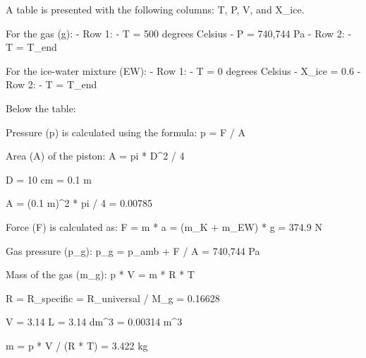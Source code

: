 A table is presented with the following columns: T, P, V, and X_ice.  

For the gas (g):  
- Row 1:  
  - T = 500 degrees Celsius  
  - P = 740,744 Pa  
- Row 2:  
  - T = T_end  

For the ice-water mixture (EW):  
- Row 1:  
  - T = 0 degrees Celsius  
  - X_ice = 0.6  
- Row 2:  
  - T = T_end  

Below the table:  

Pressure (p) is calculated using the formula:  
p = F / A  

Area (A) of the piston:  
A = pi * D^2 / 4  

D = 10 cm = 0.1 m  

A = (0.1 m)^2 * pi / 4 = 0.00785  

Force (F) is calculated as:  
F = m * a = (m_K + m_EW) * g = 374.9 N  

Gas pressure (p_g):  
p_g = p_amb + F / A = 740,744 Pa  

Mass of the gas (m_g):  
p * V = m * R * T  

R = R_specific = R_universal / M_g = 0.16628  

V = 3.14 L = 3.14 dm^3 = 0.00314 m^3  

m = p * V / (R * T) = 3.422 kg